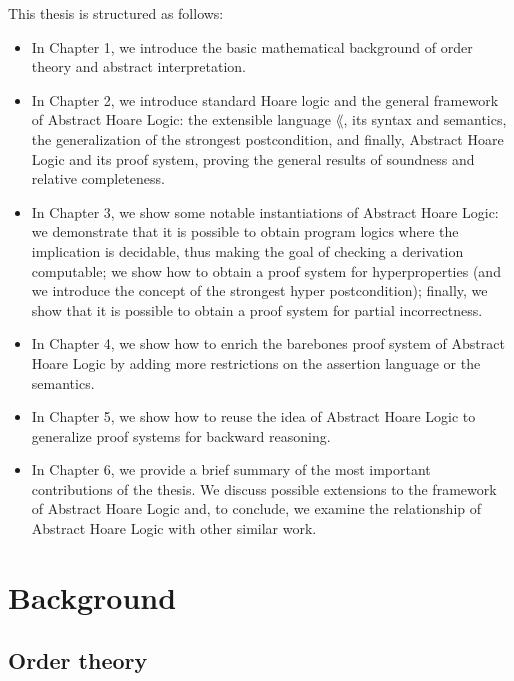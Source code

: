 \documentclass[
  10pt,       %
  twoside,    %
  a4paper,    %
  english,    %
  tikz,       %
  openright,  %
]{book}
\begin{document}
This thesis is structured as follows:
\begin{itemize}
  \item In Chapter 1, we introduce the basic mathematical background of order
    theory and abstract interpretation.

  \item In Chapter 2, we introduce standard Hoare logic and the general
    framework of Abstract Hoare Logic: the extensible language $\lang$, its
    syntax and semantics, the generalization of the strongest postcondition,
    and finally, Abstract Hoare Logic and its proof system, proving the general
    results of soundness and relative completeness.

  \item In Chapter 3, we show some notable instantiations of Abstract Hoare
    Logic: we demonstrate that it is possible to obtain program logics where
    the implication is decidable, thus making the goal of checking a derivation
    computable; we show how to obtain a proof system for hyperproperties (and
    we introduce the concept of the strongest hyper postcondition); finally, we
    show that it is possible to obtain a proof system for partial
    incorrectness.

  \item In Chapter 4, we show how to enrich the barebones proof system of
    Abstract Hoare Logic by adding more restrictions on the assertion language
    or the semantics.

  \item In Chapter 5, we show how to reuse the idea of Abstract Hoare Logic to
    generalize proof systems for backward reasoning.

  \item In Chapter 6, we provide a brief summary of the most important
    contributions of the thesis. We discuss possible extensions to the
    framework of Abstract Hoare Logic and, to conclude, we examine the
    relationship of Abstract Hoare Logic with other similar work.
\end{itemize}

\chapter{Background}

\section{Order theory}\label{sec:backround:order_theory}
\end{document}
